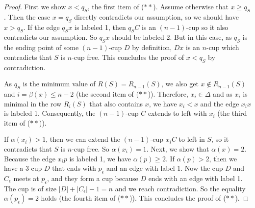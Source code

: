 \documentclass{amsart}
\theoremstyle{definition}
\numberwithin{thm}{section}
\begin{document}
\begin{proof}
First we show $x < q_S$, the first item of ($\ast\ast$). Assume otherwise that $x \geq q_S$. Then the case $x = q_S$ directly contradicts our assumption, so we should have $x > q_S$.
If the edge $q_Sx$ is labeled 1, then $q_S C$ is an $(n-1)$-cup so it also contradicts our assumption.
So $q_Sx$ should be labeled 2. But in this case,
as $q_S$ is the ending point of some $(n-1)$-cup $D$ by definition, $Dx$ is an $n$-cup which contradicts that $S$ is $n$-cup free.
This concludes the proof of $x < q_S$ by contradiction.

As $q_S$ is the minimum value of $R(S) = R_{n-1}(S)$, we also get $x \not\in R_{n-1}(S)$ and $i = \beta(x) \leq n - 2$ (the second item of ($\ast\ast$)).
Therefore, $x_i \in \Delta$ and as $x_i$ is minimal in the row $R_i(S)$ that also contains $x$,
we have $x_i < x$ and the edge $x_i x$ is labeled 1.
Consequently, the $(n-1)$-cup $C$ extends to left with $x_i$ (the third item of ($\ast\ast$)).

If $\alpha(x_i) > 1$, then we can extend the $(n-1)$-cup $x_iC$ to left in $S$, so it contradicts that $S$ is $n$-cup free.
So $\alpha(x_i) = 1$.
Next, we show that $\alpha(x) = 2$.
Because the edge $x_{i}p$ is labeled 1,
we have $\alpha(p) \geq 2$.
If $\alpha(p) > 2$, then we have a 3-cup $D$ that ends with $p_\epsilon$ and an edge with label 1.
Now the cup $D$ and $C_\epsilon$ meets at $p_\epsilon$, and they form a cup because $D$ ends with an edge with label 1. 
The cup is of size $|D| + |C_\epsilon| - 1 = n$ and we reach contradiction.
So the equality $\alpha(p_\epsilon) = 2$ holds (the fourth item of ($\ast\ast$)).
This concludes the proof of ($\ast\ast$).

\end{proof}
\end{document}
